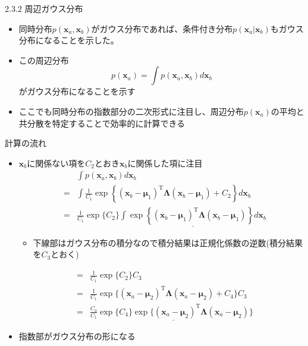 \begin{frame}{2.3.2 周辺ガウス分布}
 \begin{itemize}
  \item 同時分布$p(\bm{x}_a,\bm{x}_b)$がガウス分布であれば、条件付き分布$p(\bm{x}_a|\bm{x}_b)$もガウス分布になることを示した。
  \item この周辺分布
        \begin{equation}
         p(\bm{x}_a) = \int p(\bm{x}_a,\bm{x}_b)d\bm{x}_b
        \end{equation}
        がガウス分布になることを示す
  \item ここでも同時分布の指数部分の二次形式に注目し、周辺分布$p(\bm{x}_a)$の平均と共分散を特定することで効率的に計算できる
 \end{itemize}
\end{frame}


\begin{frame}{計算の流れ}
 \begin{itemize}
  \item $\bm{x}_b$に関係ない項を$C_2$とおき$\bm{x}_b$に関係した項に注目
        \begin{eqnarray*}
         && \int p(\bm{x}_a,\bm{x}_b)d\bm{x}_b \\
         &=& \int \frac{1}{C_1}\exp\left\{(\bm{x}_b-\bm{\mu}_1)^{\mathrm{T}}\bm{\Lambda}(\bm{x}_b-\bm{\mu}_1)+C_2\right\}d\bm{x}_b \\
         &=& \frac{1}{C_1}\exp\{C_2\}\underline{\int \exp\left\{(\bm{x}_b-\bm{\mu}_1)^{\mathrm{T}}\bm{\Lambda}(\bm{x}_b-\bm{\mu}_1)\right\}d\bm{x}_b}
        \end{eqnarray*}
        \begin{itemize}
         \item 下線部はガウス分布の積分なので積分結果は正規化係数の逆数(積分結果を$C_3$とおく)
        \end{itemize}
        \begin{eqnarray*}
         &=&\frac{1}{C_1}\exp\{C_2\}C_3 \\
         &=&\frac{1}{C_1}\exp\{(\bm{x}_a-\bm{\mu}_2)^{\mathrm{T}}\bm{\Lambda} (\bm{x}_a-\bm{\mu}_2)+C_4\}C_3\\
         &=&\frac{C_3}{C_1}\underline{\exp\{C_4\}\exp\{(\bm{x}_a-\bm{\mu}_2)^{\mathrm{T}}\bm{\Lambda} (\bm{x}_a-\bm{\mu}_2)}\}
        \end{eqnarray*}
  \item 指数部がガウス分布の形になる
 \end{itemize}
\end{frame}


